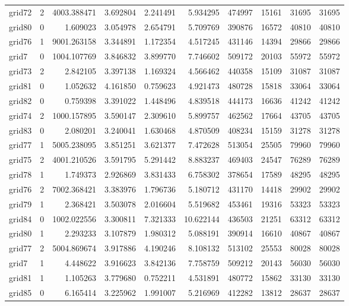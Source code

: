 \documentclass[../../../thesis.tex]{subfiles}
\begin{document}
\begin{longtable}{|l|r|r|r|r|r|r|r|r|r|}
grid72 & 2 & 4003.388471 & 3.692804 & 2.241491 & 5.934295 & 474997 & 15161 & 31695 & 31695 \\
grid80 & 0 & 1.609023 & 3.054978 & 2.654791 & 5.709769 & 390876 & 16572 & 40810 & 40810 \\
grid76 & 1 & 9001.263158 & 3.344891 & 1.172354 & 4.517245 & 431146 & 14394 & 29866 & 29866 \\
grid7 & 0 & 1004.107769 & 3.846832 & 3.899770 & 7.746602 & 509172 & 20103 & 55972 & 55972 \\
grid73 & 2 & 2.842105 & 3.397138 & 1.169324 & 4.566462 & 440358 & 15109 & 31087 & 31087 \\
grid81 & 0 & 1.052632 & 4.161850 & 0.759623 & 4.921473 & 480728 & 15818 & 33064 & 33064 \\
grid82 & 0 & 0.759398 & 3.391022 & 1.448496 & 4.839518 & 444173 & 16636 & 41242 & 41242 \\
grid74 & 2 & 1000.157895 & 3.590147 & 2.309610 & 5.899757 & 462562 & 17664 & 43705 & 43705 \\
grid83 & 0 & 2.080201 & 3.240041 & 1.630468 & 4.870509 & 408234 & 15159 & 31278 & 31278 \\
grid77 & 1 & 5005.238095 & 3.851251 & 3.621377 & 7.472628 & 513054 & 25505 & 79960 & 79960 \\
grid75 & 2 & 4001.210526 & 3.591795 & 5.291442 & 8.883237 & 469403 & 24547 & 76289 & 76289 \\
grid78 & 1 & 1.749373 & 2.926869 & 3.831433 & 6.758302 & 378654 & 17589 & 48295 & 48295 \\
grid76 & 2 & 7002.368421 & 3.383976 & 1.796736 & 5.180712 & 431170 & 14418 & 29902 & 29902 \\
grid79 & 1 & 2.368421 & 3.503078 & 2.016604 & 5.519682 & 453461 & 19316 & 53323 & 53323 \\
grid84 & 0 & 1002.022556 & 3.300811 & 7.321333 & 10.622144 & 436503 & 21251 & 63312 & 63312 \\
grid80 & 1 & 2.293233 & 3.107879 & 1.980312 & 5.088191 & 390914 & 16610 & 40867 & 40867 \\
grid77 & 2 & 5004.869674 & 3.917886 & 4.190246 & 8.108132 & 513102 & 25553 & 80028 & 80028 \\
grid7 & 1 & 4.448622 & 3.916623 & 3.842136 & 7.758759 & 509212 & 20143 & 56030 & 56030 \\
grid81 & 1 & 1.105263 & 3.779680 & 0.752211 & 4.531891 & 480772 & 15862 & 33130 & 33130 \\
grid85 & 0 & 6.165414 & 3.225962 & 1.991007 & 5.216969 & 412282 & 13812 & 28637 & 28637 \\

\end{longtable}
\end{document}

